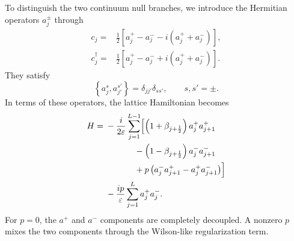 \documentclass[reprint,amsmath,amssymb,aps,showkeys,superscriptaddress]{revtex4-2}
\begin{document}
To distinguish the two continuum null branches, we introduce the
Hermitian operators $a_j^\pm$ through
\begin{subequations}
\label{eq:a_definition}
\begin{align}
  c_j
  ={}&
  \frac{1}{2}
  \left[
    a_j^+-a_j^-
    -i\left(a_j^++a_j^-\right)
  \right],
  \\
  c_j^\dagger
  ={}&
  \frac{1}{2}
  \left[
    a_j^+-a_j^-
    +i\left(a_j^++a_j^-\right)
  \right].
\end{align}
\end{subequations}
They satisfy
\begin{equation}
  \left\{
    a_j^s,a_{j'}^{s'}
  \right\}
  =
  \delta_{jj'}\delta_{ss'},
  \qquad
  s,s'=\pm.
  \label{eq:a_anticommutation}
\end{equation}
In terms of these operators, the lattice Hamiltonian becomes
\begin{align}
  H
  ={}&
  -\frac{i}{2\varepsilon}
  \sum_{j=1}^{L-1}
  \Bigl[
    \left(
      1+\beta_{j+\frac12}
    \right)
    a_j^+a_{j+1}^+
  \nonumber\\
  &\hspace{12mm}
    -
    \left(
      1-\beta_{j+\frac12}
    \right)
    a_j^-a_{j+1}^-
  \nonumber\\
  &\hspace{12mm}
    +
    p\left(
      a_j^-a_{j+1}^+
      -
      a_j^+a_{j+1}^-
    \right)
  \Bigr]
  \nonumber\\
  &-
  \frac{i p}{\varepsilon}
  \sum_{j=1}^{L}
  a_j^+a_j^- .
  \label{eq:H_in_a}
\end{align}
For $p=0$, the $a^+$ and $a^-$ components are completely
decoupled. A nonzero $p$ mixes the two components through the
Wilson-like regularization term.
\end{document}
